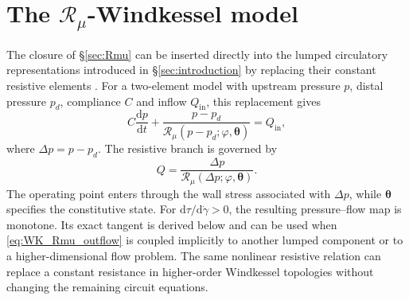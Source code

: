\documentclass[lineno]{jfm}
\begin{document}
\section{The \texorpdfstring{$\mathcal{R}_{\mu}$}{Rmu}-Windkessel model}
\label{sec:RmuWindkessel}
The closure of \S\ref{sec:Rmu} can be inserted directly into the lumped
circulatory representations introduced in \S\ref{sec:introduction} by
replacing their constant resistive elements
\citep{frank1990basic,olufsen2003deriving,westerhof2009arterial}. For a
two-element model with upstream pressure $p$, distal pressure $p_d$,
compliance $C$ and inflow $Q_{\mathrm{in}}$, this replacement gives
\begin{equation}
C\frac{\mathrm{d}p}{\mathrm{d}t}
+
\frac{p-p_d}
{\mathcal{R}_{\mu}
(p-p_d;\varphi,\boldsymbol\theta)}
=
Q_{\mathrm{in}},
\label{eq:Rmu_WK_balance}
\end{equation}
where $\Delta p=p-p_d$. The resistive branch is governed by
\begin{equation}
Q
=
\frac{\Delta p}
{\mathcal{R}_{\mu}
(\Delta p;\varphi,\boldsymbol\theta)}.
\label{eq:WK_Rmu_outflow}
\end{equation}
The operating point enters through the wall stress associated with
$\Delta p$, while $\boldsymbol\theta$ specifies the constitutive state. For
$\mathrm{d}\tau/\mathrm{d}\dot\gamma>0$, the resulting pressure--flow map is
monotone. Its exact tangent is derived below and can be used when
\eqref{eq:WK_Rmu_outflow} is coupled implicitly to another lumped component or
to a higher-dimensional flow problem. The same nonlinear resistive relation
can replace a constant resistance in higher-order Windkessel topologies
without changing the remaining circuit equations.
\end{document}
